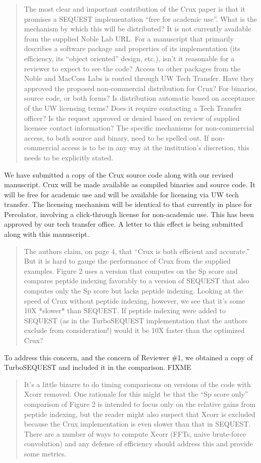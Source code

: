\documentclass{article}
\newcommand{\breview}{\begin{quotation}\begin{em}\noindent}
\newcommand{\ereview}{\end{em}\end{quotation}}
\begin{document}
\breview The most clear and important contribution of the Crux paper
is that it promises a SEQUEST implementation ``free for academic
use''. What is the mechanism by which this will be distributed? It is
not currently available from the supplied Noble Lab URL. For a
manuscript that primarily describes a software package and properties
of its implementation (its efficiency, its ``object oriented'' design,
etc.), isn't it reasonable for a reviewer to expect to see the code?
Access to other packages from the Noble and MacCoss Labs is routed
through UW Tech Transfer. Have they approved the proposed
non-commercial distribution for Crux? For binaries, source code, or
both forms? Is distribution automatic based on acceptance of the UW
licensing terms? Does it require contacting a Tech Transfer officer?
Is the request approved or denied based on review of supplied licensee
contact information? The specific mechanisms for non-commercial
access, to both source and binary, need to be spelled out. If
non-commercial access is to be in any way at the institution's
discretion, this needs to be explicitly stated. \ereview

We have submitted a copy of the Crux source code along with our
revised manuscript.  Crux will be made available as compiled binaries
and source code.  It will be free for academic use and will be
available for licensing via UW tech transfer.  The licensing mechanism
will be identical to that currently in place for Percolator, involving
a click-through license for non-academic use.  This has been approved
by our tech transfer office.  A letter to this effect is being
submitted along with this manuscript.

\breview The authors claim, on page 4, that ``Crux is both efficient
and accurate.'' But it is hard to gauge the performance of Crux from
the supplied examples. Figure 2 uses a version that computes on the Sp
score and compares peptide indexing favorably to a version of SEQUEST
that also computes only the Sp score but lacks peptide
indexing. Looking at the speed of Crux without peptide indexing,
however, we see that it's some 10X *slower* than SEQUEST. If peptide
indexing were added to SEQUEST (as in the TurboSEQUEST implementation
that the authors exclude from consideration!) would it be 10X faster
than the optimized Crux? \ereview

To address this concern, and the concern of Reviewer \#1, we obtained
a copy of TurboSEQUEST and included it in the comparison.
FIXME

\breview It's a little bizarre to do timing comparisons on versions of
the code with Xcorr removed. One rationale for this might be that the
``Sp score only'' comparison of Figure 2 is intended to focus only on
the relative gains from peptide indexing, but the reader might also
suspect that Xcorr is excluded because the Crux implementation is even
slower than that in SEQUEST. There are a number of ways to compute
Xcorr (FFTs, naive brute-force convolution) and any defense of
efficiency should address this and provide some metrics. \ereview
\end{document}
